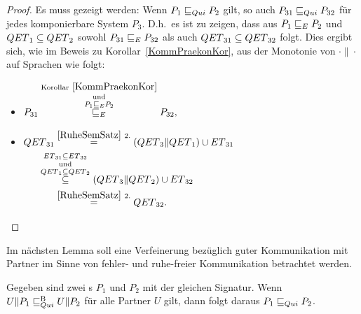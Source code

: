 \begin{proof}
  Es muss gezeigt werden: Wenn $P_1 \sqsubseteq  _{Qui} P_2$ gilt, so auch $P_{31} \sqsubseteq  _{Qui}
  P_{32}$ für jedes komponierbare System $P_3$. D.h.\ es ist zu zeigen, dass
  aus $P_1 \sqsubseteq  _E P_2$ und $QET{}_1\subseteq QET{}_2$ sowohl $P_{31} \sqsubseteq  _E
  P_{32}$ als auch $QET{}_{31}\subseteq QET{}_{32}$ folgt. Dies ergibt sich,
  wie im Beweis zu Korollar~\ref{KommPraekonKor}, aus der Monotonie von
  $\cdot\|\cdot$ auf Sprachen wie folgt:
  \begin{itemize}
    \item $\begin{aligned}[t]
        P_{31} \overset{\mathrm{Korollar}~\ref{KommPraekonKor}}{
          \overset{\mathrm{und}}{\overset{P_1 \sqsubseteq  _E P_2}{ \sqsubseteq  _E}}}
        P_{32},
    \end{aligned}$
    \item $\begin{aligned}[t]
        \QET{}_{31} &\overset{\ref{RuheSemSatz}~2.}{=}
        (\QET{}_3\|\QET{}_1)\cup \ET{}_{31}\\
        &\hspace{-0.6cm}\overset{\ET{}_{31}\subseteq
      \ET{}_{32}}{\overset{\mathrm{und}}{\overset{\QET{}_1\subseteq
      \QET{}_2}{\subseteq}}} (\QET{}_3\|\QET{}_2) \cup \ET{}_{32}\\
        &\overset{\ref{RuheSemSatz}~2.}{=} \QET{}_{32}.
    \end{aligned}$
  \vspace*{-0.7cm}
  \end{itemize}
\end{proof}

Im nächsten Lemma soll eine Verfeinerung bezüglich guter Kommunikation mit
Partner im Sinne von fehler- und ruhe-freier Kommunikation betrachtet werden.

\begin{Lem}
  \label{RuheVerfeinLem}
  Gegeben sind zwei \MEIO{}s $P_1$ und $P_2$ mit der gleichen Signatur. Wenn
  $U\|P_1 \sqsubseteq  _{Qui}^\mathrm{B} U\|P_2$ für alle Partner $U$ gilt, dann folgt daraus $P_1 \sqsubseteq  _{Qui}
  P_2$.
\end{Lem}

